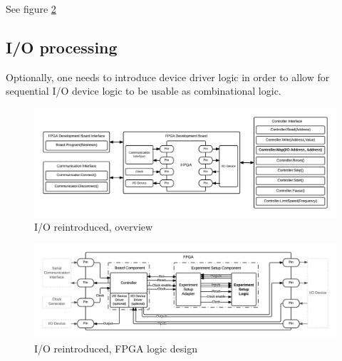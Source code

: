 \documentclass[openright]{template/uva-bachelor-thesis}
\begin{document}
See figure \ref{fig:fpga-io}

\subsection{I/O processing}
Optionally, one needs to introduce device driver logic in order to allow for sequential I/O device logic to be usable as combinational logic. 




\begin{figure}[h]
\centering
\includegraphics[width=\textwidth]{img/overview-io}
\caption{I/O reintroduced, overview}
\label{fig:overview-io}
\end{figure}


\begin{figure}[h]
\centering
\includegraphics[width=\textwidth]{img/fpga-io2}
\caption{I/O reintroduced, FPGA logic design}
\label{fig:fpga-io}
\end{figure}



\end{document}
